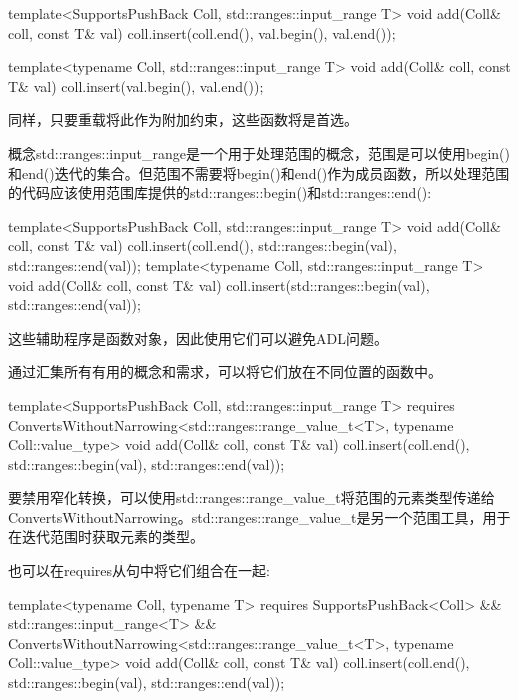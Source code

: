 \begin{cpp}
template<SupportsPushBack Coll, std::ranges::input_range T>
void add(Coll& coll, const T& val)
{
	coll.insert(coll.end(), val.begin(), val.end());
}

template<typename Coll, std::ranges::input_range T>
void add(Coll& coll, const T& val)
{
	coll.insert(val.begin(), val.end());
}
\end{cpp}

同样，只要重载将此作为附加约束，这些函数将是首选。

概念std::ranges::input\_range是一个用于处理范围的概念，范围是可以使用begin()和end()迭代的集合。但范围不需要将begin()和end()作为成员函数，所以处理范围的代码应该使用范围库提供的std::ranges::begin()和std::ranges::end():

\begin{cpp}
template<SupportsPushBack Coll, std::ranges::input_range T>
void add(Coll& coll, const T& val)
{
	coll.insert(coll.end(), std::ranges::begin(val), std::ranges::end(val));
}
template<typename Coll, std::ranges::input_range T>
void add(Coll& coll, const T& val)
{
	coll.insert(std::ranges::begin(val), std::ranges::end(val));
}
\end{cpp}

这些辅助程序是函数对象，因此使用它们可以避免ADL问题。


通过汇集所有有用的概念和需求，可以将它们放在不同位置的函数中。

\begin{cpp}
template<SupportsPushBack Coll, std::ranges::input_range T>
requires ConvertsWithoutNarrowing<std::ranges::range_value_t<T>,
typename Coll::value_type>
void add(Coll& coll, const T& val)
{
	coll.insert(coll.end(),
				std::ranges::begin(val), std::ranges::end(val));
}
\end{cpp}

要禁用窄化转换，可以使用std::ranges::range\_value\_t将范围的元素类型传递给ConvertsWithoutNarrowing。std::ranges::range\_value\_t是另一个范围工具，用于在迭代范围时获取元素的类型。

也可以在requires从句中将它们组合在一起:

\begin{cpp}
template<typename Coll, typename T>
requires SupportsPushBack<Coll> &&
			std::ranges::input_range<T> &&
			ConvertsWithoutNarrowing<std::ranges::range_value_t<T>,
							typename Coll::value_type>
void add(Coll& coll, const T& val)
{
	coll.insert(coll.end(),
				std::ranges::begin(val), std::ranges::end(val));
}
\end{cpp}

